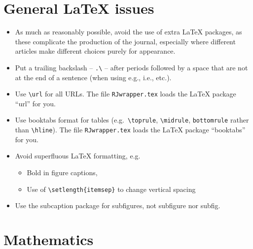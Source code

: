 \documentclass[11pt]{article}
\begin{document}
\section*{General LaTeX issues}

\begin{itemize}
\item As much as reasonably possible, avoid the use of extra LaTeX packages,
  as these complicate the production of the journal, especially where different
  articles make different choices purely for appearance.
\item Put a trailing backslash -- \verb+.\+ -- after periods followed
  by a space that are not at the end of a sentence (when using e.g.,
  i.e., etc.).
\item Use \verb+\url+ for all URLs. The file \texttt{RJwrapper.tex} 
  loads the LaTeX package ``url'' for you.
\item Use booktabs format for tables (e.g.\ \verb+\toprule+, 
  \verb+\midrule+, \verb+bottomrule+ rather than \verb+\hline+).
  The file \texttt{RJwrapper.tex} loads the LaTeX package ``booktabs''
  for you.
\item Avoid superfluous LaTeX formatting, e.g.
  \begin{itemize}
  \item Bold in figure captions,
  \item Use of \verb+\setlength{itemsep}+ to change vertical spacing
  \end{itemize}
\item Use the subcaption package for subfigures, not subfigure nor
  subfig.
\end{itemize}

\section*{Mathematics}
\end{document}
